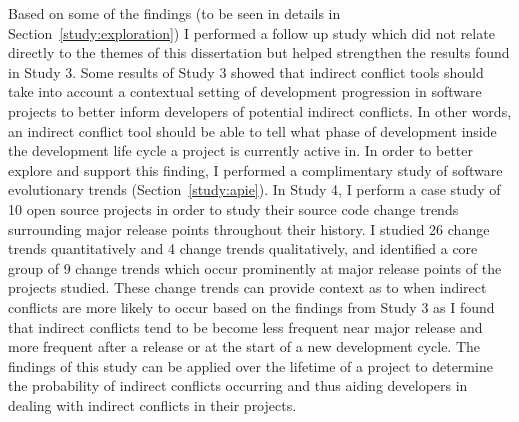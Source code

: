 Based on some of the findings (to be seen in details in Section~\ref{study:exploration}) I performed a follow up study
which did not relate directly to the themes of this dissertation but helped strengthen the results found in Study 3.
Some results of Study 3 showed that indirect conflict tools should take into account a contextual setting of development
progression in software projects to better inform developers of potential indirect conflicts. In other words, an indirect
conflict tool should be able to tell what phase of development inside the development life cycle a project is currently
active in. In order to better explore and support this finding, I performed a complimentary study of software evolutionary trends (Section~\ref{study:apie}).
In Study 4, I perform a case study of 10 open source projects in order to study their source code change trends surrounding major release points
throughout their history. I studied 26 change trends quantitatively and 4 change trends qualitatively, and identified a core group of 9 change trends which occur
prominently at major release points of the projects studied. These change trends can provide context as to when indirect conflicts are more likely
to occur based on the findings from Study 3 as I found that indirect conflicts tend to be become less frequent near major release and more
frequent after a release or at the start of a new development cycle. The findings of this study can be applied over the lifetime of a project
to determine the probability of indirect conflicts occurring and thus aiding developers in dealing with indirect conflicts in their projects.




